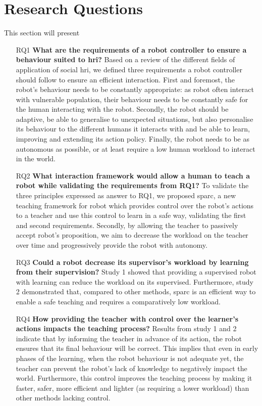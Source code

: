 \section{Research Questions}
This section will present
\begin{itemize}
\item [RQ1] \textbf{What are the requirements of a robot controller to ensure a behaviour suited to \gls{hri}?} 
Based on a review of the different fields of application of social \gls{hri}, we defined three requirements a robot controller should follow to ensure an efficient interaction. First and foremost, the robot's behaviour needs to be constantly appropriate: as robot often interact with vulnerable population, their behaviour needs to be constantly safe for the human interacting with the robot. Secondly, the robot should be adaptive, be able to generalise to unexpected situations, but also personalise its behaviour to the different humans it interacts with and be able to learn, improving and extending its action policy. Finally, the robot needs to be as autonomous as possible, or at least require a low human workload to interact in the world.

\item [RQ2] \textbf{What interaction framework would allow a human to teach a robot while validating the requirements from RQ1?}
To validate the three principles expressed as answer to RQ1, we proposed \gls{sparc}, a new teaching framework for robot which provides control over the robot's actions to a teacher and use this control to learn in a safe way, validating the first and second requirements. Secondly, by allowing the teacher to passively accept robot's proposition, we aim to decrease the workload on the teacher over time and progressively provide the robot with autonomy. 

\item [RQ3] \textbf{Could a robot decrease its supervisor's workload by learning from their supervision?}
Study 1 showed that providing a supervised robot with learning can reduce the workload on its supervised. Furthermore, study 2 demonstrated that, compared to other methods, \gls{sparc} is an efficient way to enable a safe teaching and requires a comparatively low workload.

\item [RQ4] \textbf{How providing the teacher with control over the learner's actions impacts the teaching process?} 
Results from study 1 and 2 indicate that by informing the teacher in advance of its action, the robot ensures that its final behaviour will be correct. This implies that even in early phases of the learning, when the robot behaviour is not adequate yet, the teacher can prevent the robot's lack of knowledge to negatively impact the world. Furthermore, this control improves the teaching process by making it faster, safer, more efficient and lighter (as requiring a lower workload) than other methods lacking control.


\end{itemize}
